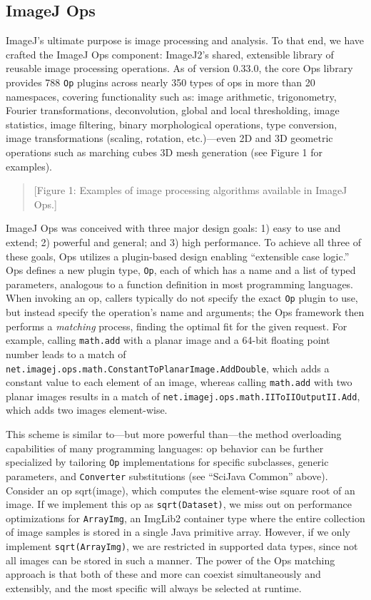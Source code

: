 \documentclass{bmcart}
\begin{document}
\subsection*{ImageJ Ops}

ImageJ's ultimate purpose is image processing and analysis. To that end, we
have crafted the ImageJ Ops component: ImageJ2's shared, extensible library of
reusable image processing operations. As of version 0.33.0, the core Ops
library provides 788 \texttt{Op} plugins across nearly 350 types of ops in more
than 20 namespaces, covering functionality such as: image arithmetic,
trigonometry, Fourier transformations, deconvolution, global and local
thresholding, image statistics, image filtering, binary morphological
operations, type conversion, image transformations (scaling, rotation,
etc.)---even 2D and 3D geometric operations such as marching cubes 3D mesh
generation (see Figure 1 for examples).

\begin{quote}
[Figure 1: Examples of image processing algorithms available in ImageJ Ops.]
\end{quote}

ImageJ Ops was conceived with three major design goals: 1) easy to use and
extend; 2) powerful and general; and 3) high performance. To achieve all three
of these goals, Ops utilizes a plugin-based design enabling ``extensible case
logic.'' Ops defines a new plugin type, \texttt{Op}, each of which has a name
and a list of typed parameters, analogous to a function definition in most
programming languages. When invoking an op, callers typically do not specify
the exact \texttt{Op} plugin to use, but instead specify the operation's name
and arguments; the Ops framework then performs a \textit{matching} process,
finding the optimal fit for the given request. For example, calling
\texttt{math.add} with a planar image and a 64-bit floating point number leads
to a match of \texttt{net.imagej.ops.math.ConstantToPlanarImage.AddDouble},
which adds a constant value to each element of an image, whereas calling
\texttt{math.add} with two planar images results in a match of
\texttt{net.imagej.ops.math.IIToIIOutputII.Add}, which adds two images
element-wise.

This scheme is similar to---but more powerful than---the method
overloading capabilities of many programming languages: op behavior can be
further specialized by tailoring \texttt{Op} implementations for specific
subclasses, generic parameters, and \texttt{Converter} substitutions (see
``SciJava Common'' above). Consider an op sqrt(image), which computes the
element-wise square root of an image. If we implement this op as
\texttt{sqrt(Dataset)}, we miss out on performance optimizations for
\texttt{ArrayImg}, an ImgLib2 container type where the entire collection of
image samples is stored in a single Java primitive array. However, if we only
implement \texttt{sqrt(ArrayImg)}, we are restricted in supported data types,
since not all images can be stored in such a manner. The power of the Ops
matching approach is that both of these and more can coexist simultaneously and
extensibly, and the most specific will always be selected at runtime.
\end{document}
